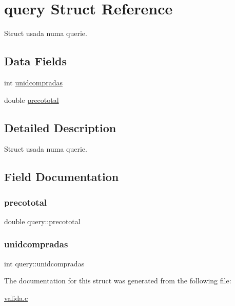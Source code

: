 \hypertarget{structquery}{}\section{query Struct Reference}
\label{structquery}


Struct usada numa querie.  


\subsection*{Data Fields}
\begin{DoxyCompactItemize}
\item 
int \mbox{\hyperlink{structquery_a3b5171cdd341339e805765e6391a2f4e}{unidcompradas}}
\item 
double \mbox{\hyperlink{structquery_ada3470ff47455c12ba0705c90ae0e6b6}{precototal}}
\end{DoxyCompactItemize}


\subsection{Detailed Description}
Struct usada numa querie. 



\subsection{Field Documentation}
\mbox{\label{structquery_ada3470ff47455c12ba0705c90ae0e6b6}} 
\subsubsection{\texorpdfstring{precototal}{precototal}}
{\footnotesize\ttfamily double query\+::precototal}

\mbox{\label{structquery_a3b5171cdd341339e805765e6391a2f4e}} 
\subsubsection{\texorpdfstring{unidcompradas}{unidcompradas}}
{\footnotesize\ttfamily int query\+::unidcompradas}



The documentation for this struct was generated from the following file\+:\begin{DoxyCompactItemize}
\item 
\mbox{\hyperlink{valida_8c}{valida.\+c}}\end{DoxyCompactItemize}
